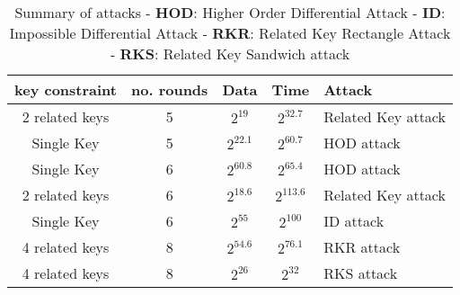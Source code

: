 \begin{table}[H]
  \centering

  \begin{tabular}{ccccl}
    \hline
    \multicolumn{1}{|l|}{key constraint} & \multicolumn{1}{l|}{no. rounds} & \multicolumn{1}{l|}{Data} & \multicolumn{1}{l|}{Time} & \multicolumn{1}{l|}{Attack}            \\ \hline
    2 related keys                       & 5                               & $2^{19}$                  & $2^{32.7}$                & \multicolumn{1}{c}{Related Key attack} \\ \hline
    Single Key                           & 5                               & $2^{22.1}$                & $2^{60.7}$                & HOD attack                             \\ \hline
    Single Key                           & 6                               & $2^{60.8}$                & $2^{65.4}$                & HOD attack                             \\ \hline
    2 related keys                       & 6                               & $2^{18.6}$                & $2^{113.6}$               & Related Key attack                     \\ \hline
    Single Key                           & 6                               & $2^{55}$                  & $2^{100}$                 & ID attack                              \\ \hline
    4 related keys                       & 8                               & $2^{54.6}$                  & $2^{76.1}$               & RKR attack                     \\ \hline
    4 related keys                       & 8                               & $2^{26}$                  & $2^{32}$                  & RKS attack
  \end{tabular}
  \captionsetup{justification=centering}
  \caption[justification=centering]{Summary of attacks - \textbf{HOD}: Higher Order
    Differential Attack - \textbf{ID}: Impossible Differential Attack  - \textbf{RKR}: Related Key Rectangle Attack  - \textbf{RKS}: Related Key Sandwich attack}
  \label{tab:kasumiattacks}
\end{table}

